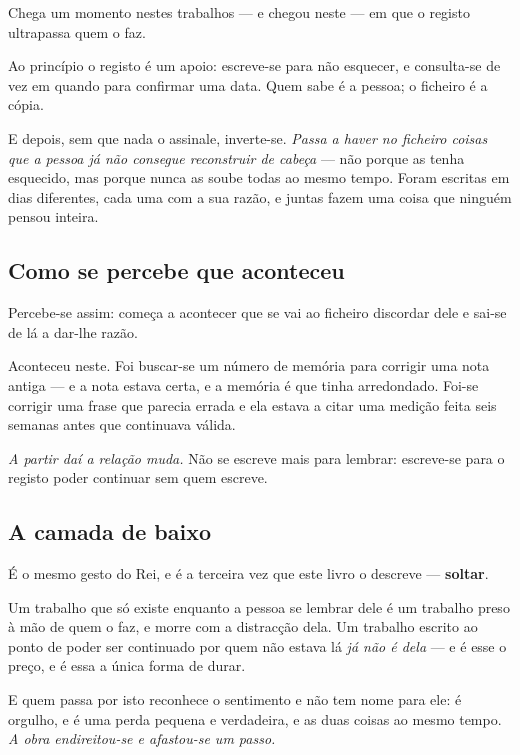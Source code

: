 \documentclass[livro.tex]{subfiles}
\begin{document}
Chega um momento nestes trabalhos --- e chegou neste --- em que o registo ultrapassa quem o faz.

\medskip

Ao princípio o registo é um apoio: escreve-se para não esquecer, e consulta-se de vez em quando
para confirmar uma data. Quem sabe é a pessoa; o ficheiro é a cópia.

\medskip

E depois, sem que nada o assinale, inverte-se. \emph{Passa a haver no ficheiro coisas que a
pessoa já não consegue reconstruir de cabeça} --- não porque as tenha esquecido, mas porque nunca
as soube todas ao mesmo tempo. Foram escritas em dias diferentes, cada uma com a sua razão, e
juntas fazem uma coisa que ninguém pensou inteira.

\subsection*{Como se percebe que aconteceu}

Percebe-se assim: começa a acontecer que se vai ao ficheiro discordar dele e sai-se de lá a dar-lhe
razão.

\medskip

Aconteceu neste. Foi buscar-se um número de memória para corrigir uma nota antiga --- e a nota
estava certa, e a memória é que tinha arredondado. Foi-se corrigir uma frase que parecia errada e
ela estava a citar uma medição feita seis semanas antes que continuava válida.

\medskip

\emph{A partir daí a relação muda.} Não se escreve mais para lembrar: escreve-se para o registo
poder continuar sem quem escreve.

\subsection*{A camada de baixo}

É o mesmo gesto do Rei, e é a terceira vez que este livro o descreve --- \textbf{soltar}.

\medskip

Um trabalho que só existe enquanto a pessoa se lembrar dele é um trabalho preso à mão de quem o
faz, e morre com a distracção dela. Um trabalho escrito ao ponto de poder ser continuado por quem
não estava lá \emph{já não é dela} --- e é esse o preço, e é essa a única forma de durar.

\medskip

E quem passa por isto reconhece o sentimento e não tem nome para ele: é orgulho, e é uma perda
pequena e verdadeira, e as duas coisas ao mesmo tempo. \emph{A obra endireitou-se e afastou-se um
passo.}
\end{document}
